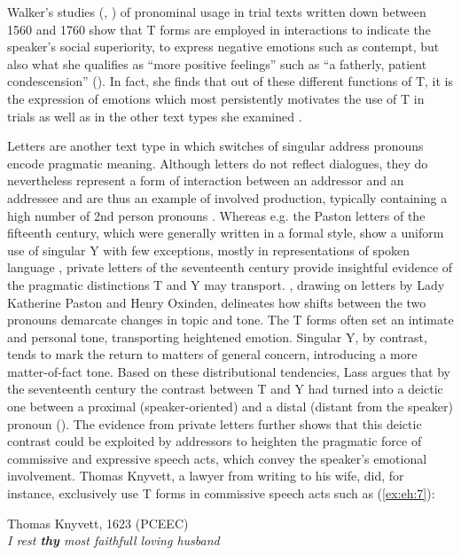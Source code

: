 \documentclass[output=paper,hidelinks]{langscibook}
\begin{document}
Walker’s studies (\citeyear{Walker2003}, \citeyear{Walker2007}) of pronominal usage in trial texts written down between 1560 and 1760 show that T forms are employed in interactions to indicate the speaker’s social superiority, to express negative emotions such as contempt, but also what she qualifies as \enquote{more positive feelings} such as \enquote{a fatherly, patient condescension} (\citeyear[91--92]{Walker2007}). In fact, she finds that out of these different functions of T, it is the expression of emotions which most persistently motivates the use of T in trials as well as in the other text types she examined \citep[338--339]{Walker2003}.

Letters are another text type in which switches of singular address pronouns encode pragmatic meaning. Although letters do not reflect dialogues, they do nevertheless represent a form of interaction between an addressor and an addressee and are thus an example of involved production, typically containing a high number of 2nd person pronouns \citep[142; 288--289]{Biber1995}. Whereas e.g. the Paston letters of the fifteenth century, which were generally written in a formal style, show a uniform use of singular Y with few exceptions, mostly in representations of spoken language \citep[129--130]{Bergs2005}, private letters of the seventeenth century provide insightful evidence of the pragmatic distinctions T and Y may transport. \citet[151--152]{Lass1999}, drawing on letters by Lady Katherine Paston and Henry Oxinden, delineates how shifts between the two pronouns demarcate changes in topic and tone. The T forms often set an intimate and personal tone, transporting heightened emotion. Singular Y, by contrast, tends to mark the return to matters of general concern, introducing a more matter-of-fact tone. Based on these distributional tendencies, Lass argues that by the seventeenth century the contrast between T and Y had turned into a deictic one between a proximal (speaker-oriented) and a distal (distant from the speaker) pronoun (\citeyear[153]{Lass1999}). The evidence from private letters further shows that this deictic contrast could be exploited by addressors to heighten the pragmatic force of commissive and expressive speech acts, which convey the speaker’s emotional involvement. Thomas Knyvett, a lawyer from  writing to his wife, did, for instance, exclusively use T forms in commissive speech acts such as (\ref{ex:eh:7}):

\ea \label{ex:eh:7} 
	Thomas Knyvett, 1623 (PCEEC)\\
	\textit{I rest \textbf{thy} most faithfull loving husband}
\z 
\end{document}
